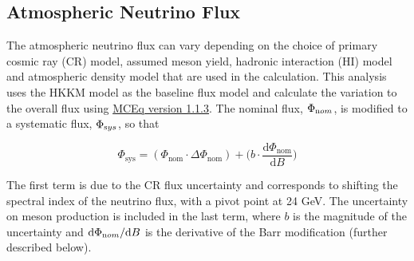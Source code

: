 \subsection{Atmospheric Neutrino Flux}
\label{section:flux_systs}

The atmospheric neutrino flux can vary depending on the choice of primary cosmic ray (CR) model, assumed meson yield, hadronic interaction (HI) model and atmospheric density model that are used in the calculation. This analysis uses the HKKM model as the baseline flux model and calculate the variation to the overall flux using \href{https://github.com/afedynitch/MCEq}{MCEq version 1.1.3}. The nominal flux, $\Phi_{\rm nom}$, is modified to a systematic flux, $\Phi_{\rm sys}$, so that

$$\Phi_{\mathrm{sys}} = (\Phi_{\mathrm{nom}} \cdot \Delta \Phi_{\mathrm{nom}}) + \bigg( b \cdot \frac{\mathrm{d} \Phi_{\mathrm{nom}}}{\mathrm{d}B} \bigg)$$

The first term is due to the CR flux uncertainty and corresponds to shifting the spectral index of the neutrino flux, with a pivot point at 24 GeV. The uncertainty on meson production is included in the last term, where $b$ is the magnitude of the uncertainty and $ {\rm d} \Phi_{\rm nom} / {\rm d}B $ is the derivative of the Barr modification  (further described below). 

